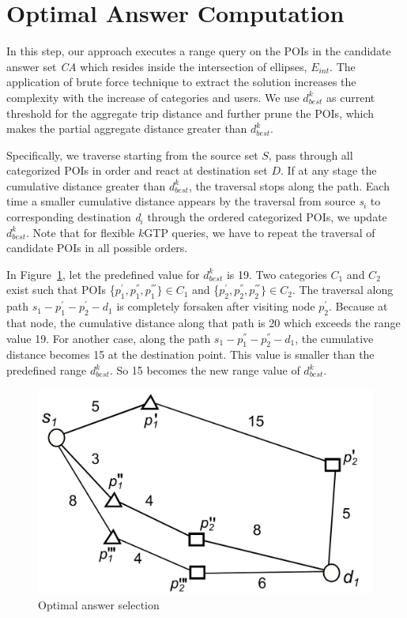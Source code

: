 \vspace*{6pt}
\section{Optimal Answer Computation}
\label{sec:step3}

In this step, our approach executes a range query on the POIs in the candidate answer set \textit{CA} which resides inside the intersection of ellipses, $E_{int}$. The application of brute force technique to extract the solution increases the complexity with the increase of categories and users. We use $d_{best}^k$ as current threshold for the aggregate trip distance and further prune the POIs, which makes the partial aggregate distance greater than $d_{best}^k$.

Specifically, we traverse starting from the source set $S$, pass through all categorized POIs in order and react at destination set $D$. If at any stage the cumulative distance greater than $d_{best}^k$, the traversal stops along the path. Each time a smaller cumulative distance appears by the traversal from source \textit{s$_{i}$} to corresponding destination \textit{d$_{i}$} through the ordered categorized POIs, we update $d_{best}^k$. Note that for flexible $k$GTP queries, we have to repeat the traversal of candidate POIs in all possible orders.

In Figure~\ref{fig:range}, let the predefined value for $d_{best}^k$ is 19. Two categories $C_1$ and $C_2$ exist such that POIs \{$p_1^{'}, p_1^{''}, p_1^{'''}\} \in C_1$ and \{$p_2^{'}, p_2^{''}, p_2^{'''}\} \in C_2$. The traversal along path $s_1 - p_1^{'} - p_2^{'} - d_1$ is completely forsaken after visiting node $p_2^{'}$. Because at that node, the cumulative distance along that path is 20 which exceeds the range value 19. For another case, along the path $s_1 - p_1^{''} - p_2^{''} - d_1$, the cumulative distance becomes 15 at the destination point. This value is smaller than the predefined range $d_{best}^k$. So 15 becomes the new range value of $d_{best}^k$.

\vspace*{12pt}
\begin{figure}[!htbp]
\centering
\includegraphics[width=0.6\columnwidth]{figures/soln1/range.pdf}
\caption{Optimal answer selection}
\label{fig:range}
\end{figure}

